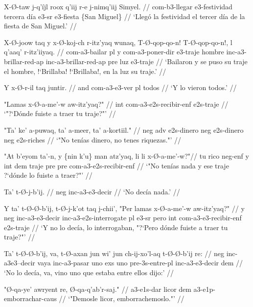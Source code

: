 \documentclass[12pt]{article}
\begin{document}
\ex
\begingl
  \gla  X-\O-taw j-q'\'ijl roox q'iij r-e j-nimq'iij Simyel. //
  \glb com-b3-llegar e3-festividad tercera d\'ia e3-sr e3-fiesta \{San Miguel\} //
  \glft `Lleg\'o la festividad el tercer d\'ia de la fiesta de San Miguel.' //
\endgl
\xe

\ex
\begingl
  \gla  X-\O-joow taq y x-\O-koj-ch r-itz'yaq wunaq, T-\O-qop-qo-n! T-\O-qop-qo-n!, l q'aaq' r-itz'iiyaq. //   %
  \glb com-a3-bailar pl y com-a3-poner-dir e3-traje hombre inc-a3-brillar-red-ap inc-a3-brillar-red-ap pre luz e3-traje //
  \glft `Bailaron y se puso su traje el hombre, !`Brillaba! !`Brillaba!, en la luz su traje.'  //
\endgl
\xe

\ex
\begingl
  \gla  Y x-\O-r-il taq juntir. //
  \glb  and com-a3-e3-ver pl todos //
  \glft `Y lo vieron todos.' //
\endgl
\xe

\ex
\begingl
  \gla "Lamas x-\O-a-me'-w aw-itz'yaq?" //
  \glb  int com-a3-e2s-recibir-enf e2s-traje //
  \glft `"?`D\'onde fuiste a traer tu traje?"' //
\endgl
\xe

\ex
\begingl
  \gla  "Ta' ke' a-puwaq, ta' a-meer, ta' a-kortiil." //
  \glb  neg adv e2s-dinero neg e2s-dinero neg e2s-riches  //
  \glft `"No ten\'ias dinero, no tenes riquezas."' //
\endgl
\xe



\ex
\begingl
  \gla  "At b'eyom ta'-n, y \{nin k'u\} man atz'yaq, li li x-\O-a-me'-w?"//
  \glb tu rico neg-enf y int dem traje pre pre com-a3-e2s-recibir-enf //
  \glft `"No ten\'ias nada y ese traje ?`d\'onde lo fuiste a traer?"' //
\endgl
\xe

\ex
\begingl
  \gla  Ta' t-\O-j-b'ij. //
  \glb neg inc-a3-e3-decir //
  \glft `No dec\'ia nada.' //
\endgl
\xe


\ex
\begingl
  \gla  Y ta' t-\O-\O-b'ij, t-\O-j-k'ot taq j-chii', "Per lamas x-\O-a-me'-w aw-itz'yaq?" //
  \glb  y neg inc-a3-e3-decir inc-a3-e2s-interrogate pl e3-sr pero int com-a3-e3-recibir-enf e2s-traje //
  \glft `Y no lo dec\'ia, lo interrogaban, "?`Pero d\'onde fuiste a traer tu traje?"' //
\endgl
\xe

\ex
\begingl
  \gla Ta' t-\O-\O-b'ij, va, t-\O-axan jun wi' jun ch-ij-xo'l-aq t-\O-\O-b'ij re: //
  \glb neg inc-a3e3--decir vaya inc-a3-pasar uno exs uno pre-3s-entre-pl inc-a3-e3-decir dem //
  \glft `No lo dec\'ia, va, vino uno que estaba entre ellos dijo:' //
\endgl
\xe

\ex
\begingl
  \gla  "\O-qa-ye' awryent re, \O-qa-q'ab'r-saj." //
  \glb  a3-e1s-dar licor dem a3-e1p-emborrachar-caus //
  \glft `"Demosle licor, emborrachemoslo."' //
\endgl
\xe
\end{document}
